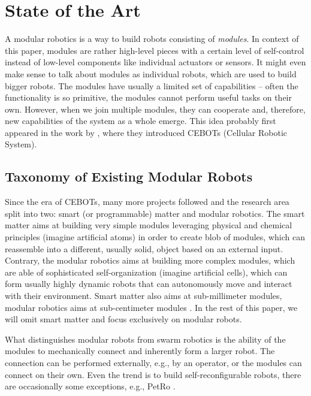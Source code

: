 \chapter{State of the Art}\label{chap:state-of-the-art}

A modular robotics is a way to build robots consisting of \emph{modules}. In
context of this paper, modules are rather high-level pieces with a certain level
of self-control instead of low-level components like individual actuators or
sensors. It might even make sense to talk about modules as individual robots,
which are used to build bigger robots. The modules have usually a limited set of
capabilities -- often the functionality is so primitive, the modules cannot
perform useful tasks on their own. However, when we join multiple modules, they
can cooperate and, therefore, new capabilities of the system as a whole emerge.
This idea probably first appeared in the work by
\textcite{DBLP:conf/icra/FukudaK90}, where they introduced CEBOTs (Cellular
Robotic System).

\section{Taxonomy of Existing Modular Robots}

Since the era of CEBOTs, many more projects followed and the research area split
into two: smart (or programmable) matter and modular robotics. The smart matter
aims at building very simple modules leveraging physical and chemical principles
(imagine artificial atoms) in order to create blob of modules, which can
reassemble into a different, usually solid, object based on an external input.
Contrary, the modular robotics aims at building more complex modules, which are
able of sophisticated self-organization (imagine artificial cells), which can
form usually highly dynamic robots that can autonomously move and interact with
their environment. Smart matter also aims at sub-millimeter modules, modular
robotics aims at sub-centimeter modules \cite{DBLP:conf/ieeealife/Christensen07,
1285597}. In the rest of this paper, we will omit smart matter and focus
exclusively on modular robots.

What distinguishes modular robots from swarm robotics is the ability of the
modules to mechanically connect and inherently form a larger robot. The
connection can be performed externally, e.g., by an operator, or the modules can
connect on their own. Even the trend is to build self-reconfigurable robots,
there are occasionally some exceptions, e.g., PetRo
\cite{DBLP:conf/ro-man/Salem14}.

